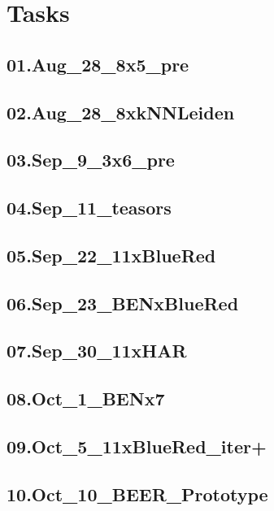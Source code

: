 \section{Tasks}
\subsection{01.Aug\_28\_8x5\_pre} \label{01.Aug_28_8x5_pre_label}
\subsection{02.Aug\_28\_8xkNNLeiden} \label{02.Aug_28_8xkNNLeiden_label}
\subsection{03.Sep\_9\_3x6\_pre} \label{03.Sep_9_3x6_pre_label}
\subsection{04.Sep\_11\_teasors} \label{04.Sep_11_teasors_label}
\subsection{05.Sep\_22\_11xBlueRed} \label{05.Sep_22_11xBlueRed_label}
\subsection{06.Sep\_23\_BENxBlueRed} \label{06.Sep_23_BENxBlueRed_label}
\subsection{07.Sep\_30\_11xHAR} \label{07.Sep_30_11xHAR_label}
\subsection{08.Oct\_1\_BENx7} \label{08.Oct_1_BENx7_label}
\subsection{09.Oct\_5\_11xBlueRed\_iter+} \label{09.Oct_5_11xBlueRed_iter+_label}
\subsection{10.Oct\_10\_BEER\_Prototype} \label{10.Oct_10_BEER_Prototype_label}
